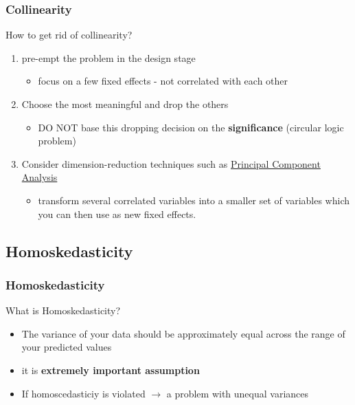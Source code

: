 \documentclass[10p]{beamer}\usepackage[]{graphicx}\usepackage[]{color}
\begin{document}
\begin{frame}
\frametitle{Collinearity}
How to get rid of collinearity?
\begin{enumerate}
\item pre-empt the problem in the design stage
	\begin{itemize}
	\item focus on a few fixed effects - not correlated with each other
	\end{itemize}
\item Choose the most meaningful and drop the others
	\begin{itemize}
	\item DO NOT base this dropping decision on the \textbf{significance} (circular logic problem)
	\end{itemize}
\item Consider dimension-reduction techniques such as \href{https://en.wikipedia.org/wiki/Principal_component_analysis}{Principal Component Analysis}
	\begin{itemize}
	\item transform several correlated variables into a smaller set of variables which you can then use as new fixed effects.
	\end{itemize}
\end{enumerate}
\end{frame}

\subsection{Homoskedasticity}
\begin{frame}
\frametitle{Homoskedasticity}
What is Homoskedasticity?
\begin{itemize}
\item The variance of your data should be approximately equal across the range of your predicted values
\item it is \textbf{extremely important assumption}
\item If homoscedasticiy is violated $\rightarrow$ a problem with unequal variances
\end{itemize}
\end{frame}
\end{document}
